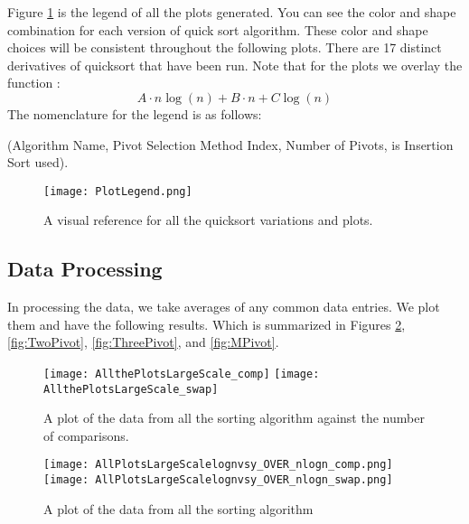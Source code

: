 	Figure \ref{fig:PlotLegend} is the legend of all the plots generated.
	You can see the color and shape combination for each version of quick sort algorithm. 
	These color and shape choices will be consistent throughout the following plots.
	There are 17 distinct derivatives of quicksort that have been run.
	Note that for the plots we overlay the function :
	\begin{equation}
		A\cdot n\log(n) + B\cdot n + C \log(n)
		\label{eq:FitFunction}
	\end{equation}
	The nomenclature for the legend is as follows: 
	\begin{center}
		(Algorithm Name, Pivot Selection Method Index, Number of Pivots, is Insertion Sort used).
	\end{center}

	\begin{figure}[ht!]
		\begin{center}   
			\texttt{[image: PlotLegend.png]}
			\label{fig:PlotLegend}
			\caption{A visual reference for all the quicksort variations and plots.}
		\end{center}
	\end{figure}

	\subsection{Data Processing}
		\label{subsec:DataProcessing}
		In processing the data, we take averages of any common data entries. We plot them and have the following results.
		Which is summarized in Figures \ref{fig:AllSorts}, \ref{fig:TwoPivot}, \ref{fig:ThreePivot}, and \ref{fig:MPivot}.

		\begin{figure}[ht!]
			\begin{center}
				\texttt{[image: AllthePlotsLargeScale\_comp]}
				\texttt{[image: AllthePlotsLargeScale\_swap]}
				\caption{A plot of the data from all the sorting algorithm against the number of comparisons.}
				\label{fig:AllSorts}
			\end{center}
		\end{figure}


		\begin{figure}[ht!]
			\begin{center}
				\texttt{[image: AllPlotsLargeScalelognvsy\_OVER\_nlogn\_comp.png]}
				\texttt{[image: AllPlotsLargeScalelognvsy\_OVER\_nlogn\_swap.png]}
				\caption{A plot of the data from all the sorting algorithm}
				\label{fig:AllSortsLog}
			\end{center}
		\end{figure}

